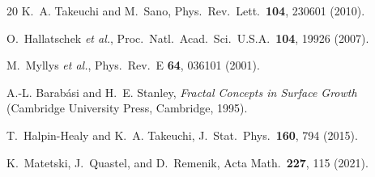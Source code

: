 \documentclass[aps,pre,twocolumn,superscriptaddress,showpacs]{revtex4-2}
\begin{document}
\begin{thebibliography}{20}
K.~A. Takeuchi and M.~Sano, Phys.\ Rev.\ Lett.\ \textbf{104}, 230601 (2010).

O.~Hallatschek \emph{et al.}, Proc.\ Natl.\ Acad.\ Sci.\ U.S.A.\ \textbf{104}, 19926 (2007).

M.~Myllys \emph{et al.}, Phys.\ Rev.\ E \textbf{64}, 036101 (2001).

A.-L. Barab\'asi and H.~E. Stanley, \emph{Fractal Concepts in Surface Growth} (Cambridge University Press, Cambridge, 1995).

T.~Halpin-Healy and K.~A. Takeuchi, J.\ Stat.\ Phys.\ \textbf{160}, 794 (2015).

K.~Matetski, J.~Quastel, and D.~Remenik, Acta Math.\ \textbf{227}, 115 (2021).

\end{thebibliography}
\end{document}
